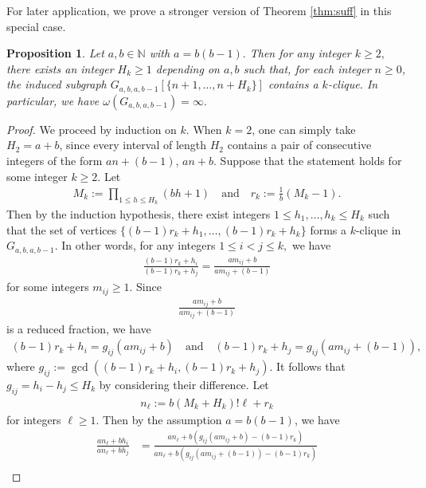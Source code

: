 \documentclass[12pt, reqno, a4paper]{amsart}
\newtheorem{proposition}{Proposition}[section]
\theoremstyle{definition}
\theoremstyle{remark}
\numberwithin{equation}{section}
\renewcommand{\leq}{\leqslant}
\renewcommand{\geq}{\geqslant}
\begin{document}
For later application, we prove a stronger version of Theorem \ref{thm:suff} in this special case.

\begin{proposition} \label{prop:a=b(b-1)}
Let $a, b \in \mathbb{N}$ with $a=b(b-1).$ Then
for any integer $k \geq 2,$ there exists an integer $H_k \geq 1$ depending on $a,b$ such that, for each integer $n\geq 0$, the induced subgraph $G_{a,b,a,b-1}[\{n+1, \ldots, n+H_k\}]$ contains a $k$-clique. In particular, we have $\omega(G_{a,b,a,b-1})=\infty.$
\end{proposition}

\begin{proof}
We proceed by induction on $k$. When \( k = 2 \), one can simply take \( H_2 = a + b \), since every interval of length \( H_2 \) contains a pair of consecutive integers of the form \( an + (b - 1) \), \( an + b \).
 Suppose that the statement holds for some integer $k \geq 2.$ Let 
\begin{align*}
M_k:=\prod_{1 \leq h \leq H_k}(bh+1) \quad \text{and} \quad r_k:=\frac{1}{b}(M_k-1).
\end{align*}
Then by the induction hypothesis, there exist integers $1 \leq h_1, \ldots, h_k \leq H_k$ such that the set of vertices $\{(b-1)r_k+h_1, \ldots, (b-1)r_k+h_k\}$ forms a $k$-clique in $G_{a,b,a,b-1}.$ In other words, for any integers $1 \leq i < j \leq k,$ we have
\begin{align*}
\frac{(b-1)r_k+h_i}{(b-1)r_k+h_j}=\frac{am_{ij}+b}{am_{ij}+(b-1)}
\end{align*}
for some integers $m_{ij} \geq 1.$ Since 
\begin{align*}
\frac{am_{ij}+b}{am_{ij}+(b-1)}
\end{align*}
is a reduced fraction, we have
\begin{gather*}
(b-1)r_k+h_i=g_{ij} (am_{ij}+b) \quad \text{and} \quad
(b-1)r_k+h_j= g_{ij}(am_{ij}+(b-1)),
\end{gather*}
where $g_{ij}:=\gcd((b-1)r_k+h_i, (b-1)r_k+h_j)$. It follows that $g_{ij}= h_i-h_j \leq H_{k}$ by considering their difference.
Let
\begin{align*}
n_{\ell} := b (M_k+H_k)! {\ell}+ r_k %
\end{align*}
for integers ${\ell} \geq 1.$ Then by the assumption $a=b(b-1)$, we have
\begin{align}
\frac{an_{\ell}+bh_i}{an_{\ell}+bh_j} &= \frac{an_{\ell}+b(g_{ij} (am_{ij}+b)-(b-1)r_k)}{an_{\ell}+b(g_{ij}(am_{ij}+(b-1))-(b-1)r_k)} \nonumber \\

\end{align}
\end{proof}
\end{document}
